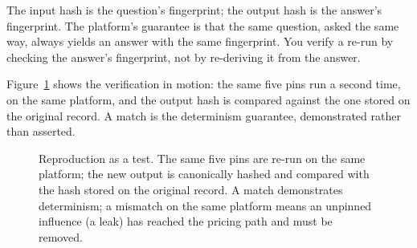 \begin{plainnote}
The input hash is the question's fingerprint; the output hash is the answer's fingerprint. The platform's guarantee is that the same question, asked the same way, always yields an answer with the same fingerprint. You verify a re-run by checking the answer's fingerprint, not by re-deriving it from the answer.
\end{plainnote}

Figure~\ref{fig:provenance-rerun} shows the verification in motion: the same five pins run a second time, on the same platform, and the output hash is compared against the one stored on the original record. A match is the determinism guarantee, demonstrated rather than asserted.

\begin{figure}[H]
\centering
{}
\caption{Reproduction as a test. The same five pins are re-run on the same platform; the new output is canonically hashed and compared with the hash stored on the original record. A match demonstrates determinism; a mismatch on the same platform means an unpinned influence (a leak) has reached the pricing path and must be removed.}
\label{fig:provenance-rerun}
\end{figure}

